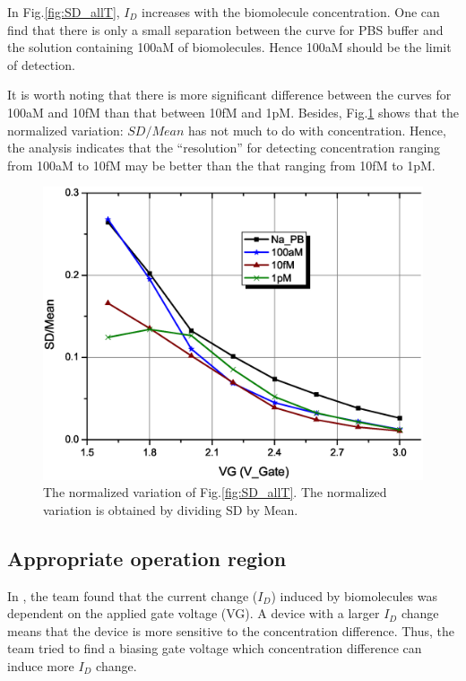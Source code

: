 In Fig.\ref{fig:SD_allT}, $I_D$ increases with the biomolecule concentration.
One can find that there is only a small separation between the curve for PBS buffer and the solution containing 100aM of biomolecules.
Hence 100aM should be the limit of detection.

It is worth noting that there is more significant difference between the curves for 100aM and 10fM than that between 10fM and 1pM.
Besides, Fig.\ref{fig:SD_allT2} shows that the normalized variation: ${SD} / {Mean}$ has not much to do with concentration.
Hence, the analysis indicates that the ``resolution'' for detecting concentration ranging from 100aM to 10fM may be better than the that ranging from 10fM to 1pM.
\begin{figure}[tb]
    \includegraphics[width=1\textwidth]{images/chapter3/128_allT_error.eps}
    \caption{The normalized variation of Fig.\ref{fig:SD_allT}. The normalized variation is obtained by dividing SD by Mean.}
    \label{fig:SD_allT2}
\end{figure}

\subsection{Appropriate operation region} \label{section:biasVg}
In \cite{C6}, the team found that the current change ($I_D$) induced by biomolecules was dependent on the applied gate voltage (VG).
A device with a larger $I_D$ change means that the device is more sensitive to the concentration difference.
Thus, the team tried to find a biasing gate voltage which concentration difference can induce more $I_D$ change.

